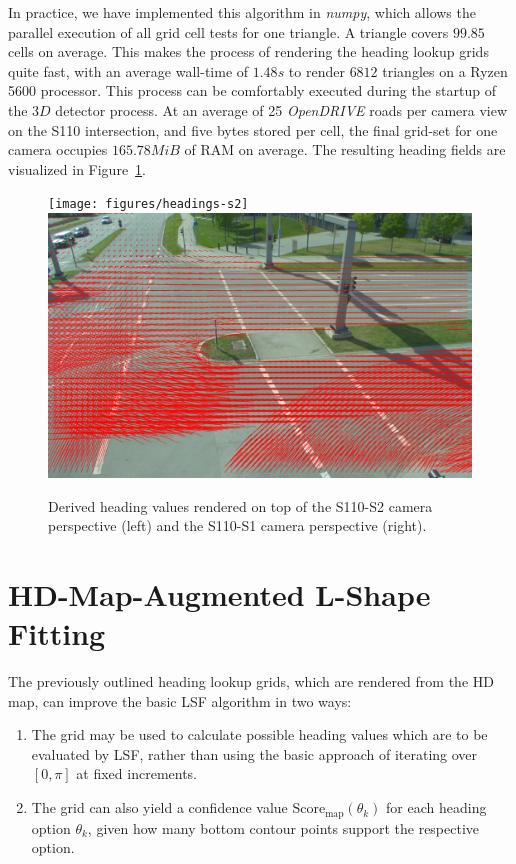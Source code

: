 In practice, we have implemented this algorithm in \textit{numpy}, which allows the parallel execution of all grid cell tests for one triangle.
A triangle covers $99.85$ cells on average.
This makes the process of rendering the heading lookup grids quite fast, with an average wall-time of $1.48s$ to render $6812$ triangles on a Ryzen 5600 processor.
This process can be comfortably executed during the startup of the $3D$ detector process.
At an average of 25 \textit{OpenDRIVE} roads per camera view on the S110 intersection, and five bytes stored per cell, the final grid-set for one camera occupies $165.78 MiB$ of RAM on average.
The resulting heading fields are visualized in Figure~\ref{fig:headings-rendered}.

\begin{figure}[htb]
    \centering
    \texttt{[image: figures/headings-s2]}
    \includegraphics[width=0.49\linewidth]{figures/headings-s1}
    \caption{Derived heading values rendered on top of the S110-S2 camera perspective (left) and the S110-S1 camera perspective (right).}
    \label{fig:headings-rendered}
\end{figure}


\section{HD-Map-Augmented L-Shape Fitting}
\label{sec:hdmaplsf}

The previously outlined heading lookup grids, which are rendered from the HD map, can improve the basic LSF algorithm in two ways:

\begin{enumerate}
    \item The grid may be used to calculate possible heading values which are to be evaluated by LSF, rather than using the basic approach of iterating over $[0, \pi]$ at fixed increments.
    \item The grid can also yield a confidence value $\text{Score}_\text{map}(\theta_k)$ for each heading option $\theta_k$, given how many bottom contour points support the respective option.
\end{enumerate}

